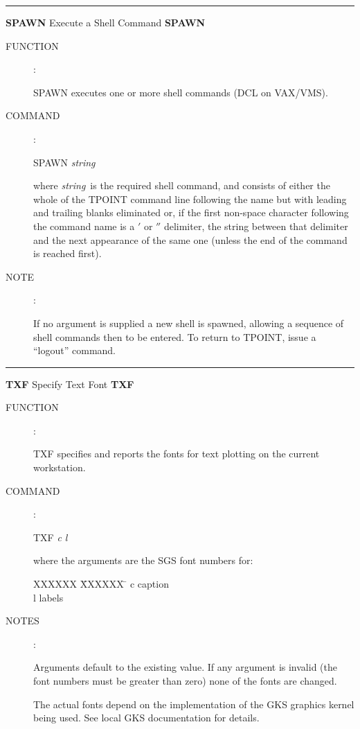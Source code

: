 \goodbreak
\rule{\textwidth}{0.3mm}
{\Large {\bf SPAWN} \hfill Execute a Shell Command \hfill {\bf SPAWN}}
\begin{description}
\item [FUNCTION]:

SPAWN executes one or more shell commands (DCL on VAX/VMS).

\item [COMMAND]:

\begin{cmd}
\> \> SPAWN {\it string}
\end{cmd}

where {\it string}\, is the required shell command, and consists of
either the whole of the TPOINT command line following the 
name but with leading and trailing blanks eliminated or,
if the first non-space character following the command name
is a $'$ or $''$ delimiter, the string between that delimiter and
the next appearance of the same one (unless the end of the
command is reached first).

\item [NOTE]:

If no argument is supplied a new shell is spawned,
allowing a sequence
of shell commands then to be entered.  To return to TPOINT, issue
a ``logout'' command.

\end{description}


\goodbreak
\rule{\textwidth}{0.3mm}
{\Large {\bf TXF} \hfill Specify Text Font \hfill {\bf TXF}}
\begin{description}
\item [FUNCTION]:

TXF specifies and reports the fonts for text
plotting on the current workstation.

\item [COMMAND]:

\begin{cmd}
\> \> TXF {\it c l}
\end{cmd}

where the arguments are the SGS font numbers for:

\begin{tabs}
XXXXXX \= XXXXXX \= \kill
\> c \> caption \\
\> l \> labels
\end{tabs}

\item [NOTES]:

Arguments default to the existing value.  If any
argument is invalid (the font numbers must be greater
than zero) none of the fonts are changed.

The actual fonts depend on the implementation of the
GKS graphics kernel being used.  See local GKS documentation
for details.

\end{description}


